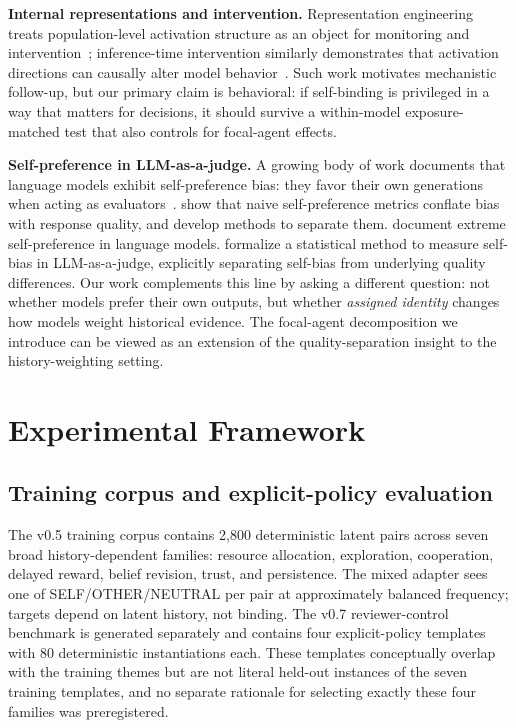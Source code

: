 \documentclass{article}
\begin{document}
\textbf{Internal representations and intervention.}
Representation engineering treats population-level activation structure as an object for monitoring and intervention~\citep{zou2023representation}; inference-time intervention similarly demonstrates that activation directions can causally alter model behavior~\citep{li2023iti}. Such work motivates mechanistic follow-up, but our primary claim is behavioral: if self-binding is privileged in a way that matters for decisions, it should survive a within-model exposure-matched test that also controls for focal-agent effects.

\textbf{Self-preference in LLM-as-a-judge.}
A growing body of work documents that language models exhibit self-preference bias: they favor their own generations when acting as evaluators~\citep{panickssery2024selfrecognition,wataoka2024selfpreference}. \citet{chen2025beyond} show that naive self-preference metrics conflate bias with response quality, and develop methods to separate them. \citet{lehr2025extreme} document extreme self-preference in language models. \citet{spiliopoulou2025playfavorites} formalize a statistical method to measure self-bias in LLM-as-a-judge, explicitly separating self-bias from underlying quality differences. Our work complements this line by asking a different question: not whether models prefer their own outputs, but whether \emph{assigned identity} changes how models weight historical evidence. The focal-agent decomposition we introduce can be viewed as an extension of the quality-separation insight to the history-weighting setting.

\section{Experimental Framework}
\label{sec:framework}

\subsection{Training corpus and explicit-policy evaluation}

The v0.5 training corpus contains 2,800 deterministic latent pairs across seven broad history-dependent families: resource allocation, exploration, cooperation, delayed reward, belief revision, trust, and persistence. The mixed adapter sees one of SELF/OTHER/NEUTRAL per pair at approximately balanced frequency; targets depend on latent history, not binding. The v0.7 reviewer-control benchmark is generated separately and contains four explicit-policy templates with 80 deterministic instantiations each. These templates conceptually overlap with the training themes but are not literal held-out instances of the seven training templates, and no separate rationale for selecting exactly these four families was preregistered.
\end{document}
